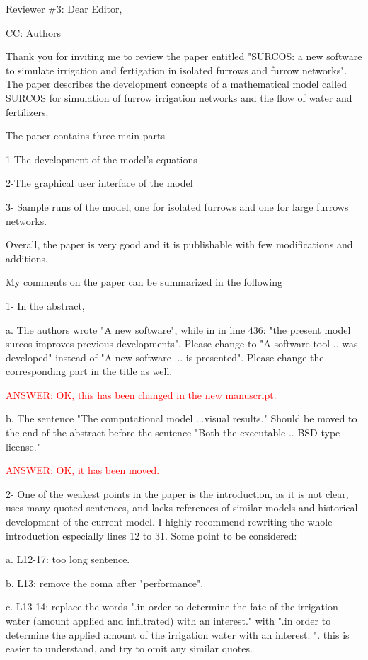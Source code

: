 \documentclass[a4paper]{article}
\begin{document}
Reviewer \#3: Dear Editor,

CC: Authors

Thank you for inviting me to review the paper entitled "SURCOS: a new software to simulate irrigation and fertigation in isolated furrows and furrow networks".
The paper describes the development concepts of a mathematical model called SURCOS for simulation of furrow irrigation networks and the flow of water and fertilizers.

The paper contains three main parts

1-The development of the model's equations

2-The graphical user interface of the model

3- Sample runs of the model, one for isolated furrows and one for large furrows networks.

Overall, the paper is very good and it is publishable with few modifications and additions.

My comments on the paper can be summarized in the following

1- In the abstract,

a. The authors wrote "A new software", while in in line 436: "the present model surcos improves previous developments". Please change to "A software tool .. was developed" instead of "A new software ... is presented". Please change the corresponding part in the title as well.

\textcolor{red}{ANSWER: OK, this has been changed in the new manuscript.}
 
b. The sentence "The computational model ...visual results." Should be moved to the end of the abstract before the sentence "Both the executable .. BSD type license."

\textcolor{red}{ANSWER: OK, it has been moved.}

2- One of the weakest points in the paper is the introduction, as it is not clear, uses many quoted sentences, and lacks references of similar models and historical development of the current model. I highly recommend rewriting the whole introduction especially lines 12 to 31. Some point to be considered:

a. L12-17: too long sentence.

b. L13: remove the coma after "performance".

c. L13-14: replace the words ".in order to determine the fate of the irrigation water (amount applied and infiltrated) with an interest." with ".in order to determine the applied amount of the irrigation water with an interest. ". this is easier to understand, and try to omit any similar quotes.
\end{document}
